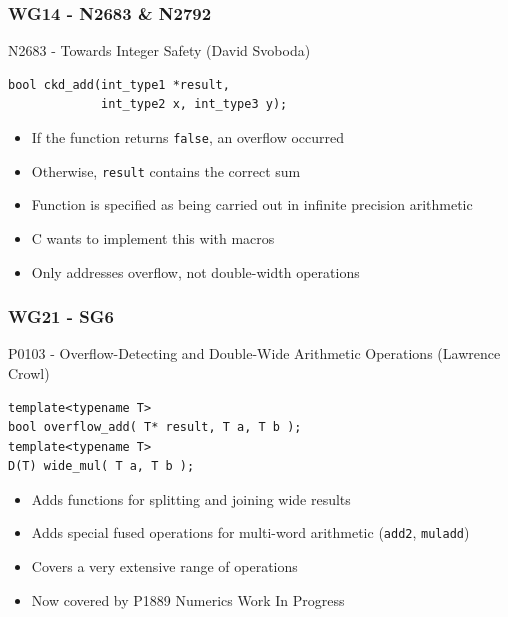 \documentclass[aspectratio=169]{beamer}
\newif\iftransitions
\begin{document}
\begin{frame}[fragile]
  \frametitle{WG14 - N2683 \& N2792}
  
  N2683 - Towards Integer Safety (David Svoboda)
  
  \begin{lstlisting}
bool ckd_add(int_type1 *result,
             int_type2 x, int_type3 y);
  \end{lstlisting}
  
  \begin{itemize}
    \item If the function returns \texttt{false}, an overflow occurred  \iftransitions \pause \fi 
    \item Otherwise, \texttt{result} contains the correct sum  \iftransitions \pause \fi 
    \item Function is specified as being carried out in infinite precision arithmetic  \iftransitions \pause \fi 
    \item C wants to implement this with macros  \iftransitions \pause \fi 
    \item Only addresses overflow, not double-width operations
  \end{itemize}
\end{frame}

\begin{frame}[fragile]
  \frametitle{WG21 - SG6}
  
  P0103 - Overflow-Detecting and Double-Wide Arithmetic Operations (Lawrence Crowl)
  
  \begin{lstlisting}
template<typename T>
bool overflow_add( T* result, T a, T b );
template<typename T>
D(T) wide_mul( T a, T b );
  \end{lstlisting}

  \iftransitions \pause \fi 
  \begin{itemize}
  \item Adds functions for splitting and joining wide results  \iftransitions \pause \fi 
  \item Adds special fused operations for multi-word arithmetic (\texttt{add2}, \texttt{muladd})  \iftransitions \pause \fi 
  \item Covers a very extensive range of operations  \iftransitions \pause \fi 
  \item Now covered by P1889 Numerics Work In Progress
  \end{itemize}
\end{frame}
\end{document}

